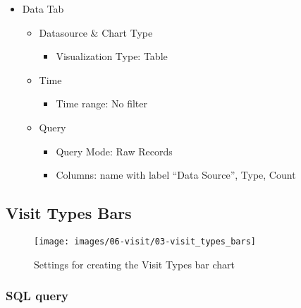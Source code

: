 \documentclass[
]{book}
\providecommand{\tightlist}{%
  \setlength{\itemsep}{0pt}\setlength{\parskip}{0pt}}
\begin{document}
\begin{itemize}
\tightlist
\item
  Data Tab

  \begin{itemize}
  \tightlist
  \item
    Datasource \& Chart Type

    \begin{itemize}
    \tightlist
    \item
      Visualization Type: Table
    \end{itemize}
  \item
    Time

    \begin{itemize}
    \tightlist
    \item
      Time range: No filter
    \end{itemize}
  \item
    Query

    \begin{itemize}
    \tightlist
    \item
      Query Mode: Raw Records
    \item
      Columns: name with label ``Data Source'', Type, Count
    \end{itemize}
  \end{itemize}
\end{itemize}

\hypertarget{visit-types-bars}{%
\subsection*{Visit Types Bars}\label{visit-types-bars}}

\begin{figure}
\texttt{[image: images/06-visit/03-visit\_types\_bars]} \caption{Settings for creating the Visit Types bar chart}\label{fig:visitTypeBars}
\end{figure}

\hypertarget{sql-query-25}{%
\subsubsection*{SQL query}\label{sql-query-25}}
\end{document}
